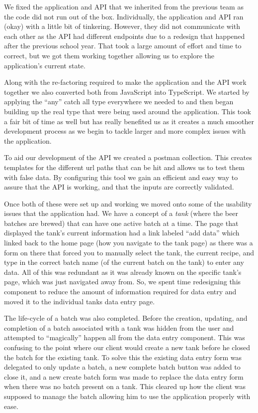 \documentclass[draftclsnofoot,onecolumn,journal,letterpaper,compsoc,10pt]{IEEEtran}
\begin{document}
We fixed the application and API that we inherited from the previous team as the code did not run out of the box.  Individually, the application and API ran (okay) with a little bit of tinkering.  However, they did not communicate with each other as the API had different endpoints due to a redesign that happened after the previous school year.  That took a large amount of effort and time to correct, but we got them working together allowing us to explore the application's current state.

Along with the re-factoring required to make the application and the API work together we also converted both from JavaScript into TypeScript.  We started by applying the ``any'' catch all type everywhere we needed to and then began building up the real type that were being used around the application.  This took a fair bit of time as well but has really benefited us as it creates a much smoother development process as we begin to tackle larger and more complex issues with the application.

To aid our development of the API we created a postman collection.  This creates templates for the different url paths that can be hit and allows us to test them with false data.  By configuring this tool we gain an efficient and easy way to assure that the API is working, and that the inputs are correctly validated.

Once both of these were set up and working we moved onto some of the usability issues that the application had.  We have a concept of a {\em tank} (where the beer batches are brewed) that can have one active batch at a time.  The page that displayed the tank's current information had a link labeled ``add data'' which linked back to the home page (how you navigate to the tank page) as there was a form on there that forced you to manually select the tank, the current recipe, and type in the correct batch name (of the current batch on the tank) to enter any data.  All of this was redundant as it was already known on the specific tank's page, which was just navigated away from.  So, we spent time redesigning this component to reduce the amount of information required for data entry and moved it to the individual tanks data entry page.

The life-cycle of a batch was also completed.  Before the creation, updating, and completion of a batch associated with a tank was hidden from the user and attempted to ``magically'' happen all from the data entry component.  This was confusing to the point where our client would create a new tank before he closed the batch for the existing tank.  To solve this the existing data entry form was delegated to only update a batch, a new complete batch button was added to close it, and a new create batch form was made to replace the data entry form when there was no batch present on a tank.  This cleared up how the client was supposed to manage the batch allowing him to use the application properly with ease.
\end{document}
